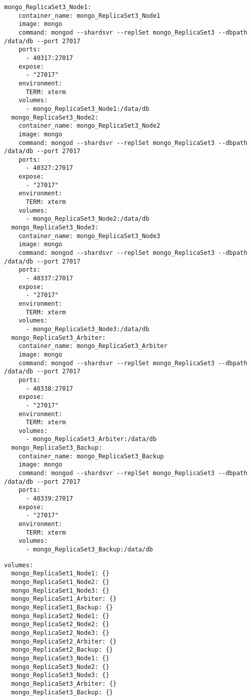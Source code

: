 \begin{lstlisting}[caption=Docker Compose Nodes for replica set 3]
mongo_ReplicaSet3_Node1:
    container_name: mongo_ReplicaSet3_Node1
    image: mongo
    command: mongod --shardsvr --replSet mongo_ReplicaSet3 --dbpath /data/db --port 27017
    ports:
      - 40317:27017
    expose:
      - "27017"
    environment:
      TERM: xterm
    volumes:
      - mongo_ReplicaSet3_Node1:/data/db
  mongo_ReplicaSet3_Node2:
    container_name: mongo_ReplicaSet3_Node2
    image: mongo
    command: mongod --shardsvr --replSet mongo_ReplicaSet3 --dbpath /data/db --port 27017
    ports:
      - 40327:27017
    expose:
      - "27017"
    environment:
      TERM: xterm
    volumes:
      - mongo_ReplicaSet3_Node2:/data/db
  mongo_ReplicaSet3_Node3:
    container_name: mongo_ReplicaSet3_Node3
    image: mongo
    command: mongod --shardsvr --replSet mongo_ReplicaSet3 --dbpath /data/db --port 27017
    ports:
      - 40337:27017
    expose:
      - "27017"
    environment:
      TERM: xterm
    volumes:
      - mongo_ReplicaSet3_Node3:/data/db
  mongo_ReplicaSet3_Arbiter:
    container_name: mongo_ReplicaSet3_Arbiter
    image: mongo
    command: mongod --shardsvr --replSet mongo_ReplicaSet3 --dbpath /data/db --port 27017
    ports:
      - 40338:27017
    expose:
      - "27017"
    environment:
      TERM: xterm
    volumes:
      - mongo_ReplicaSet3_Arbiter:/data/db
  mongo_ReplicaSet3_Backup:
    container_name: mongo_ReplicaSet3_Backup
    image: mongo
    command: mongod --shardsvr --replSet mongo_ReplicaSet3 --dbpath /data/db --port 27017
    ports:
      - 40339:27017
    expose:
      - "27017"
    environment:
      TERM: xterm
    volumes:
      - mongo_ReplicaSet3_Backup:/data/db
\end{lstlisting}

\begin{lstlisting}[caption=Docker Compose storage for nodes]
volumes:
  mongo_ReplicaSet1_Node1: {}
  mongo_ReplicaSet1_Node2: {}
  mongo_ReplicaSet1_Node3: {}
  mongo_ReplicaSet1_Arbiter: {}
  mongo_ReplicaSet1_Backup: {}
  mongo_ReplicaSet2_Node1: {}
  mongo_ReplicaSet2_Node2: {}
  mongo_ReplicaSet2_Node3: {}
  mongo_ReplicaSet2_Arbiter: {}
  mongo_ReplicaSet2_Backup: {}
  mongo_ReplicaSet3_Node1: {}
  mongo_ReplicaSet3_Node2: {}
  mongo_ReplicaSet3_Node3: {}
  mongo_ReplicaSet3_Arbiter: {}
  mongo_ReplicaSet3_Backup: {}
\end{lstlisting}
